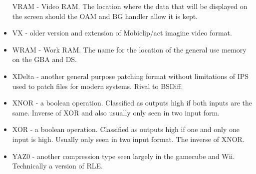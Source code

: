 \documentclass[
]{book}
\begin{document}
\begin{itemize}
  VRAM - Video RAM. The location where the data that will be displayed on the screen should the OAM and BG handler allow it is kept.
\item
  VX - older version and extension of Mobiclip/act imagine video format.
\item
  WRAM - Work RAM. The name for the location of the general use memory on the GBA and DS.
\item
  XDelta - another general purpose patching format without limitations of IPS used to patch files for modern systems. Rival to BSDiff.
\item
  XNOR - a boolean operation. Classified as outputs high if both inputs are the same. Inverse of XOR and also usually only seen in two input form.
\item
  XOR - a boolean operation. Classified as outputs high if one and only one input is high. Usually only seen in two input format. The inverse of XNOR.
\item
  YAZ0 - another compression type seen largely in the gamecube and Wii. Technically a version of RLE.
\end{itemize}

  
\end{document}
